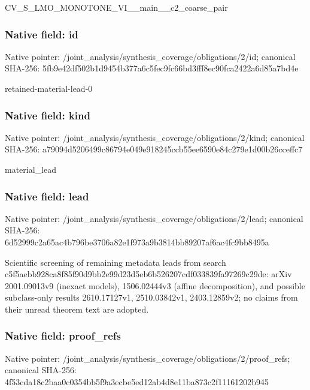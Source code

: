 \documentclass[10pt,a4paper]{article}
\begin{document}
\begingroup\raggedright\sloppy CV\_\allowbreak{}S\_\allowbreak{}LMO\_\allowbreak{}MONOTONE\_\allowbreak{}VI\_\allowbreak{}\_\allowbreak{}main\_\allowbreak{}\_\allowbreak{}c2\_\allowbreak{}coarse\_\allowbreak{}pair\par\endgroup

\subsubsection{Native field: id}
Native pointer: /joint\_\allowbreak{}analysis/synthesis\_\allowbreak{}coverage/obligations/2/id; canonical SHA-256: 5fb9e42df502b1d9454b377a6c5fec9fc66bd3fff8ec90fca2422a6d85a7bd4e

\begingroup\raggedright\sloppy retained-material-lead-0\par\endgroup

\subsubsection{Native field: kind}
Native pointer: /joint\_\allowbreak{}analysis/synthesis\_\allowbreak{}coverage/obligations/2/kind; canonical SHA-256: a79094d5206499c86794e049e918245ccb55ee6590e84c279e1d00b26cceffc7

\begingroup\raggedright\sloppy material\_\allowbreak{}lead\par\endgroup

\subsubsection{Native field: lead}
Native pointer: /joint\_\allowbreak{}analysis/synthesis\_\allowbreak{}coverage/obligations/2/lead; canonical SHA-256: 6d52999c2a65ac4b796be3706a82e1f973a9b3814bb89207af6ac4fc9bb8495a

\begingroup\raggedright\sloppy Scientific screening of remaining metadata leads from search c5f5aebb928ca8f85f90d9bb2e99d23d5eb6b526207cdf033839fa97269c29de:\allowbreak{} arXiv 2001.09013v9 (inexact models),\allowbreak{} 1506.02444v3 (affine decomposition),\allowbreak{} and possible subclass-only results 2610.17127v1,\allowbreak{} 2510.03842v1,\allowbreak{} 2403.12859v2;\allowbreak{} no claims from their unread theorem text are adopted.\par\endgroup

\subsubsection{Native field: proof\_\allowbreak{}refs}
Native pointer: /joint\_\allowbreak{}analysis/synthesis\_\allowbreak{}coverage/obligations/2/proof\_\allowbreak{}refs; canonical SHA-256: 4f53cda18c2baa0c0354bb5f9a3ecbe5ed12ab4d8e11ba873c2f11161202b945
\end{document}
